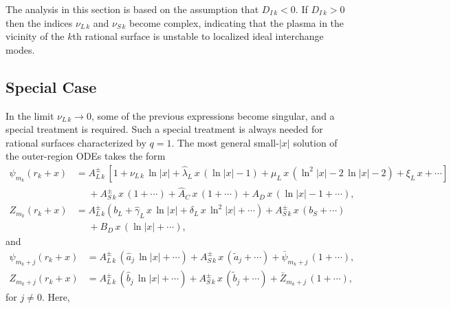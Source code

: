 \documentclass[12pt,prb,aps]{revtex4-1}
\begin{document}
The  analysis in this section is based on the assumption that $ D_{I\,k}< 0$.
 If $D_{I\,k}>0$ then the indices $\nu_{L\,k}$ and $\nu_{S\,k}$ become
complex, indicating that the plasma in the vicinity of the $k$th rational surface is unstable to localized ideal interchange modes.\cite{mercier}

\subsection{Special Case}\label{sspec}
In the limit $\nu_{L\,k}\rightarrow 0$, some of the previous expressions become singular, and a special treatment is required. Such a special
treatment is always needed for  rational  surfaces characterized by $q=1$.  
The most general small-$|x|$ solution of the outer-region ODEs 
takes the form
\begin{align}
\psi_{m_k}(r_k+x)&=A_{L\,k}^\pm \,[1+\nu_{L\,k}\,\ln|x|+\hat{\lambda}_{L}\,x\,(\ln |x|-1)+\mu_{L}\,x\,(\ln^2\!|x|-2\,\ln|x|-2) + \xi_{L}\,x+\cdots]  \nonumber\\[0.5ex]&\phantom{=}+ A_{S\,k}^{\pm}\,x\,(1+\cdots) + \hat{A}_{C}\,x\,(1+\cdots)+ A_{D}\,x\,(\ln |x|-1 + \cdots),\\[0.5ex]
Z_{m_k}(r_k+x)&= A_{L\,k}^\pm\left(b_L+\hat{\gamma}_{L}\,x\,\ln |x|+\delta_{L}\,x\,\ln^2\!|x|+\cdots\right) +A_{S\,k}^\pm\,x\,(b_{S}+\cdots)\nonumber\\[0.5ex]&\phantom{=} + B_{D}\,x\,(\ln |x|+\cdots),
\end{align}
and 
\begin{align}
\psi_{m_k+j}(r_k+x)&=A_{L\,k}^\pm\,(\hat{a}_j\,\ln |x|+\cdots)+A_{S\,k}^\pm\,x\,(\tilde{a}_j+\cdots)  + \bar{\psi}_{m_k+j}\,(1+\cdots),\\[0.5ex]
Z_{m_k+j}(r_k+x)&= A_{L\,k}^\pm\,(\hat{b}_j \,\ln |x|+ \cdots) +  A_{S\,k}^\pm\,x\,(\tilde{b}_j + \cdots) +\bar{Z}_{m_k+j}\,(1+\cdots),
\end{align}
for $j\neq 0$. 
Here, 
\end{document}
